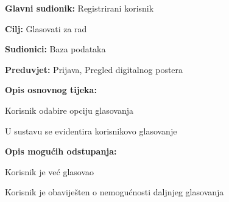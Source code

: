 					\noindent {}
					\begin{packed_item}
						
						\item \textbf{Glavni sudionik: } Registrirani korisnik
						\item  \textbf{Cilj:} Glasovati za rad
						\item  \textbf{Sudionici:} Baza podataka
						\item  \textbf{Preduvjet:} Prijava, Pregled digitalnog postera
						\item  \textbf{Opis osnovnog tijeka:}
						
						\item[] \begin{packed_enum}
							
							\item Korisnik odabire opciju glasovanja
							\item U sustavu se evidentira korisnikovo glasovanje
							
						\end{packed_enum}
						
						\item  \textbf{Opis mogućih odstupanja:}
						
						\item[] \begin{packed_item}
							
							\item[2.a] Korisnik je već glasovao
							\item[] \begin{packed_enum}
								
								\item Korisnik je obaviješten o nemogućnosti daljnjeg glasovanja
								
							\end{packed_enum}
						\end{packed_item}
					\end{packed_item}
					

